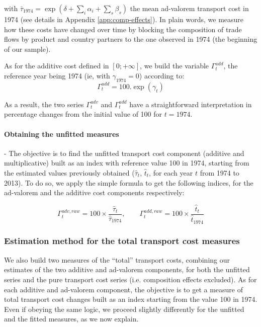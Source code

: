 \documentclass[a4paper,11pt]{article}
\begin{document}
\noindent with $\bar{\tau}_{1974} = \exp(\delta +\sum_i \alpha_i +\sum_s \beta_s)$ the mean ad-valorem transport cost in 1974 (see details in Appendix \ref{app:comp-effects}).
In plain words, we measure how these costs have changed over time by blocking the composition of trade flows by product and country partners to the one observed in 1974 (the beginning of our sample).

As for the additive cost defined in $[0;+\infty]$, we build the variable $\Gamma^{add}_t$, the reference year being 1974 (ie, with $\gamma_{1974}=0$) according to:
\begin{equation}
\Gamma^{add}_t = 100.\exp(\gamma_t) \label{eq:comp_effects_add}
\end{equation}

\noindent As a result, the two series $\Gamma^{adv}_t$ and $\Gamma^{add}_t$ have a straightforward interpretation in percentage changes from the initial value of 100 for $t=1974$.


\paragraph{Obtaining the unfitted measures} - The objective is to find the unfitted transport cost component (additive and multiplicative) built as an index with reference value 100 in 1974, starting from the estimated values previously obtained ($\widehat{\tau}_t$, $\widehat{t}_t$, for each year $t$ from 1974 to 2013).
To do so, we apply the simple formula to get the following indices, for the ad-valorem and the additive cost components respectively:

$$\Gamma^{adv, raw}_t = 100\times\frac{\widehat{\tau}_t}{\widehat{\tau}_{1974}},\qquad \Gamma^{add, raw}_t = 100\times\frac{\widehat{t}_t}{\widehat{t}_{1974}}$$



\subsubsection{Estimation method for the total transport cost measures}

We also build two measures of the ``total'' transport costs, combining our estimates of the two additive and ad-valorem components, for both the unfitted series and the pure transport cost series (i.e. composition effects excluded).
As for each additive and ad-valorem component, the objective is to get a measure of total transport cost changes built as an index starting from the value 100 in 1974.
Even if obeying the same logic, we proceed slightly differently for the unfitted and the fitted measures, as we now explain.
\smallskip
\end{document}
